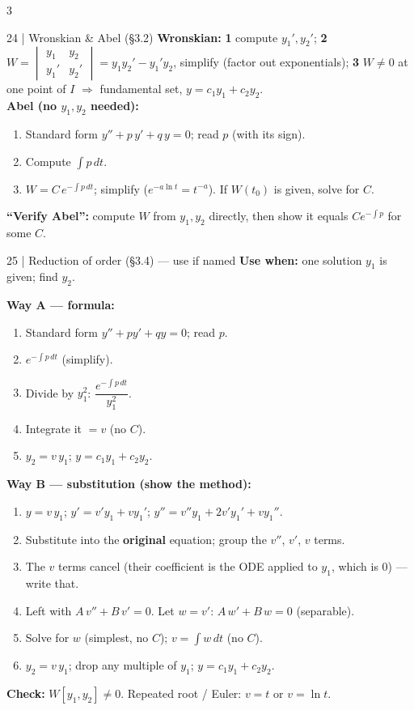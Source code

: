 \documentclass[8pt]{extarticle}
\newcommand{\key}[1]{\textcolor{grn}{\textbf{#1}}}
\newcommand{\when}[1]{\textcolor{amb}{\textbf{Use when:}} #1\par}
\newcommand{\chk}[1]{\par\textcolor{grn}{\textbf{Check:}} #1}
\begin{document}
\begin{multicols*}{3}
\begin{card}{24 \;|\; Wronskian \& Abel (\S3.2)}
\key{Wronskian:} \;\textbf{1} compute $y_1',y_2'$; \;\textbf{2} $W=\begin{vmatrix}y_1&y_2\\y_1'&y_2'\end{vmatrix}=y_1y_2'-y_1'y_2$, simplify (factor out exponentials); \;\textbf{3} $W\ne0$ at one point of $I$ $\Rightarrow$ fundamental set, $y=c_1y_1+c_2y_2$.\\
\key{Abel (no $y_1,y_2$ needed):}
\begin{enumerate}
\item Standard form $y''+p\,y'+q\,y=0$; read $p$ (with its sign).
\item Compute $\int p\,dt$.
\item $W=C\,e^{-\int p\,dt}$; simplify ($e^{-a\ln t}=t^{-a}$). If $W(t_0)$ is given, solve for $C$.
\end{enumerate}
\key{``Verify Abel'':} compute $W$ from $y_1,y_2$ directly, then show it equals $Ce^{-\int p}$ for some $C$.
\end{card}

\begin{card}{25 \;|\; Reduction of order (\S3.4) --- \textnormal{use if named}}
\when{one solution $y_1$ is given; find $y_2$.}
\key{Way A --- formula:}
\begin{enumerate}
\item Standard form $y''+py'+qy=0$; read $p$.
\item $e^{-\int p\,dt}$ (simplify).
\item Divide by $y_1^2$: \;$\dfrac{e^{-\int p\,dt}}{y_1^2}$.
\item Integrate it $=v$ (no $C$).
\item $y_2=v\,y_1$; \;$y=c_1y_1+c_2y_2$.
\end{enumerate}
\key{Way B --- substitution (show the method):}
\begin{enumerate}
\item $y=v\,y_1$; \;$y'=v'y_1+vy_1'$; \;$y''=v''y_1+2v'y_1'+vy_1''$.
\item Substitute into the \textbf{original} equation; group the $v''$, $v'$, $v$ terms.
\item The $v$ terms cancel (their coefficient is the ODE applied to $y_1$, which is $0$) --- write that.
\item Left with $A\,v''+B\,v'=0$. Let $w=v'$: $A\,w'+B\,w=0$ (separable).
\item Solve for $w$ (simplest, no $C$); $v=\int w\,dt$ (no $C$).
\item $y_2=v\,y_1$; drop any multiple of $y_1$; $y=c_1y_1+c_2y_2$.
\end{enumerate}
\chk{$W[y_1,y_2]\ne0$. Repeated root / Euler: $v=t$ or $v=\ln t$.}
\end{card}


\end{multicols*}
\end{document}
